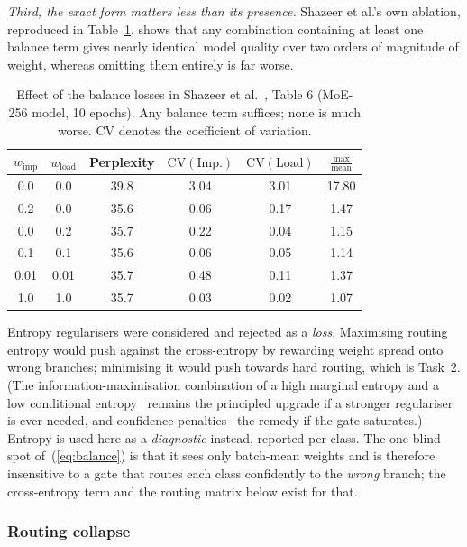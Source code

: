 \documentclass[conference]{IEEEtran}
\begin{document}
\emph{Third, the exact form matters less than its presence.} Shazeer et al.'s own
ablation, reproduced in Table~\ref{tab:shazeer}, shows that any combination
containing at least one balance term gives nearly identical model quality over
two orders of magnitude of weight, whereas omitting them entirely is far worse.

\begin{table}[t]
\caption{Effect of the balance losses in Shazeer et al.~\cite{shazeer2017outrageously},
Table 6 (MoE-256 model, 10 epochs). Any balance term suffices; none is much
worse. $\mathrm{CV}$ denotes the coefficient of variation.}
\label{tab:shazeer}
\centering
\begin{tabular}{@{}cccccc@{}}
\toprule
$w_\text{imp}$ & $w_\text{load}$ & Perplexity & $\mathrm{CV}(\text{Imp.})$ & $\mathrm{CV}(\text{Load})$ & $\frac{\max}{\text{mean}}$ \\
\midrule
0.0 & 0.0 & 39.8 & 3.04 & 3.01 & 17.80 \\
0.2 & 0.0 & 35.6 & 0.06 & 0.17 & 1.47 \\
0.0 & 0.2 & 35.7 & 0.22 & 0.04 & 1.15 \\
0.1 & 0.1 & 35.6 & 0.06 & 0.05 & 1.14 \\
0.01 & 0.01 & 35.7 & 0.48 & 0.11 & 1.37 \\
1.0 & 1.0 & 35.7 & 0.03 & 0.02 & 1.07 \\
\bottomrule
\end{tabular}
\end{table}

Entropy regularisers were considered and rejected as a \emph{loss}. Maximising
routing entropy would push against the cross-entropy by rewarding weight spread
onto wrong branches; minimising it would push towards hard routing, which is
Task~2. (The information-maximisation combination of a high marginal entropy and
a low conditional entropy~\cite{krause2010discriminative,grandvalet2004semi}
remains the principled upgrade if a stronger regulariser is ever needed, and
confidence penalties~\cite{pereyra2017regularizing} the remedy if the gate
saturates.) Entropy is used here as a \emph{diagnostic} instead, reported per
class. The one blind spot of~(\ref{eq:balance}) is that it sees only batch-mean
weights and is therefore insensitive to a gate that routes each class
confidently to the \emph{wrong} branch; the cross-entropy term and the routing
matrix below exist for that.

\subsubsection{Routing collapse}
\end{document}
